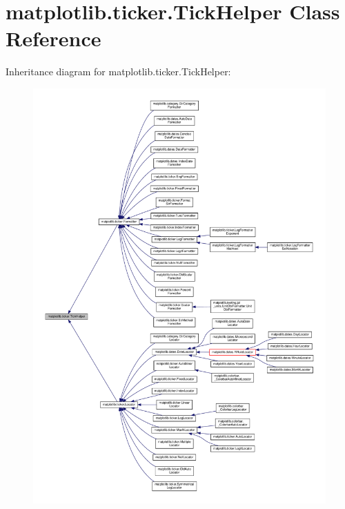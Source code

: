 \hypertarget{classmatplotlib_1_1ticker_1_1TickHelper}{}\section{matplotlib.\+ticker.\+Tick\+Helper Class Reference}
\label{classmatplotlib_1_1ticker_1_1TickHelper}


Inheritance diagram for matplotlib.\+ticker.\+Tick\+Helper\+:
\nopagebreak
\begin{figure}[H]
\begin{center}
\leavevmode
\includegraphics[width=350pt]{classmatplotlib_1_1ticker_1_1TickHelper__inherit__graph}
\end{center}
\end{figure}

